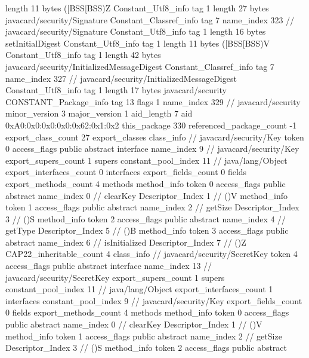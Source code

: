 {{{			length	11
			bytes	([BSS[BSS)Z
		}
		Constant_Utf8_info {
			tag	1
			length	27
			bytes	javacard/security/Signature
		}
		Constant_Classref_info {
			tag	7
			name_index	323		// javacard/security/Signature
		}
		Constant_Utf8_info {
			tag	1
			length	16
			bytes	setInitialDigest
		}
		Constant_Utf8_info {
			tag	1
			length	11
			bytes	([BSS[BSS)V
		}
		Constant_Utf8_info {
			tag	1
			length	42
			bytes	javacard/security/InitializedMessageDigest
		}
		Constant_Classref_info {
			tag	7
			name_index	327		// javacard/security/InitializedMessageDigest
		}
		Constant_Utf8_info {
			tag	1
			length	17
			bytes	javacard/security
		}
		CONSTANT_Package_info {
			tag	13
			flags	1
			name_index	329		// javacard/security
			minor_version	3
			major_version	1
			aid_length	7
			aid	0xA0:0x0:0x0:0x0:0x62:0x1:0x2
		}
	}
	this_package	330
	referenced_package_count	-1
	export_class_count	27
	export_classes {
		class_info {		// javacard/security/Key
			token	0
			access_flags	public abstract interface
			name_index	9		// javacard/security/Key
			export_supers_count	1
			supers {
				constant_pool_index	11		// java/lang/Object
			}
			export_interfaces_count	0
			interfaces {
			}
			export_fields_count	0
			fields {
			}
			export_methods_count	4
			methods {
				method_info {
					token	0
					access_flags	public abstract
					name_index	0		// clearKey
					Descriptor_Index	1		// ()V
				}
				method_info {
					token	1
					access_flags	public abstract
					name_index	2		// getSize
					Descriptor_Index	3		// ()S
				}
				method_info {
					token	2
					access_flags	public abstract
					name_index	4		// getType
					Descriptor_Index	5		// ()B
				}
				method_info {
					token	3
					access_flags	public abstract
					name_index	6		// isInitialized
					Descriptor_Index	7		// ()Z
				}
			}
			CAP22_inheritable_count	4
		}
		class_info {		// javacard/security/SecretKey
			token	4
			access_flags	public abstract interface
			name_index	13		// javacard/security/SecretKey
			export_supers_count	1
			supers {
				constant_pool_index	11		// java/lang/Object
			}
			export_interfaces_count	1
			interfaces {
				constant_pool_index	9		// javacard/security/Key
			}
			export_fields_count	0
			fields {
			}
			export_methods_count	4
			methods {
				method_info {
					token	0
					access_flags	public abstract
					name_index	0		// clearKey
					Descriptor_Index	1		// ()V
				}
				method_info {
					token	1
					access_flags	public abstract
					name_index	2		// getSize
					Descriptor_Index	3		// ()S
				}
				method_info {
					token	2
					access_flags	public abstract
}}}}}
